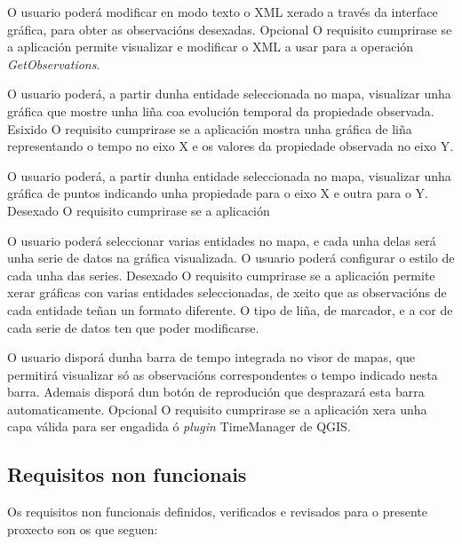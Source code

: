		  	{O usuario poderá modificar en modo texto o XML xerado a través da interface gráfica,  para obter as observacións desexadas.}%
			{Opcional}%
			{O requisito cumprirase se a aplicación permite visualizar e modificar o XML a usar para a operación \emph{GetObservations}.}%
			
		  	{O usuario poderá, a partir dunha entidade seleccionada no mapa, visualizar unha gráfica que mostre unha liña coa evolución temporal da propiedade observada.}%
			{Esixido}%
			{O requisito cumprirase se a aplicación mostra unha gráfica de liña representando o tempo no eixo X e os valores da propiedade observada no eixo Y.}%
			
		  	{O usuario poderá, a partir dunha entidade seleccionada no mapa, visualizar unha gráfica de puntos indicando unha propiedade para o eixo X e outra para o Y.}%
			{Desexado}%
			{O requisito cumprirase se a aplicación}%
			
		  	{O usuario poderá seleccionar varias entidades no mapa, e cada unha delas será unha serie de datos na gráfica visualizada. O usuario poderá configurar o estilo de cada unha das series.}%
			{Desexado}%
			{O requisito cumprirase se a aplicación permite xerar gráficas con varias entidades seleccionadas, de xeito que as observacións de cada entidade teñan un formato diferente. O tipo de liña, de marcador, e a cor de cada serie de datos ten que poder modificarse.}%
			
		  	{O usuario disporá dunha barra de tempo integrada no visor de mapas, que permitirá visualizar só as observacións correspondentes o tempo indicado nesta barra. Ademais disporá dun botón de reprodución que desprazará esta barra automaticamente.}%
			{Opcional}%
			{O requisito cumprirase se a aplicación xera unha capa válida para ser engadida ó \emph{plugin} TimeManager de QGIS.}%

\subsection{Requisitos non funcionais}
Os requisitos non funcionais definidos, verificados e revisados para o presente proxecto son os que seguen:

